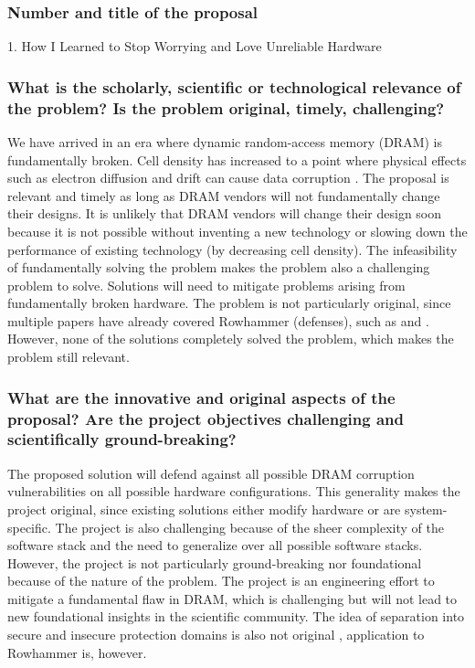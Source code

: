 \subsubsection*{Number and title of the proposal}
1. How I Learned to Stop Worrying and Love Unreliable Hardware

\subsubsection*{What is the scholarly, scientific or technological relevance of the problem? Is the problem original, timely, challenging?}
We have arrived in an era where dynamic random-access memory (DRAM) is fundamentally broken. Cell density has increased to a point where physical effects such as electron diffusion and drift can cause data corruption \cite{dram_physics}. The proposal is relevant and timely as long as DRAM vendors will not fundamentally change their designs. It is unlikely that DRAM vendors will change their design soon because it is not possible without inventing a new technology or slowing down the performance of existing technology (by decreasing cell density). The infeasibility of fundamentally solving the problem makes the problem also a challenging problem to solve. Solutions will need to mitigate problems arising from fundamentally broken hardware. The problem is not particularly original, since multiple papers have already covered Rowhammer (defenses), such as \cite{brasser2016cant} and \cite{van2016drammer}. However, none of the solutions completely solved the problem, which makes the problem still relevant.

\subsubsection*{What are the innovative and original aspects of the proposal? Are the project objectives challenging and scientifically ground-breaking?}
The proposed solution will defend against all possible DRAM corruption vulnerabilities on all possible hardware configurations. This generality makes the project original, since existing solutions either modify hardware or are system-specific. The project is also challenging because of the sheer complexity of the software stack and the need to generalize over all possible software stacks. However, the project is not particularly ground-breaking nor foundational because of the nature of the problem. The project is an engineering effort to mitigate a fundamental flaw in DRAM, which is challenging but will not lead to new foundational insights in the scientific community. The idea of separation into secure and insecure protection domains is also not original \cite{efficient_protection}, application to Rowhammer is, however.

